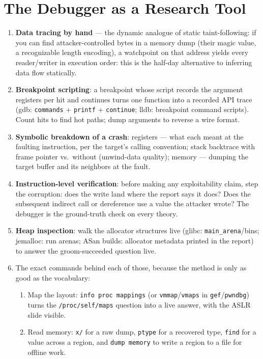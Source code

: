 \documentclass[12pt]{Training}
\begin{document}
\section*{The Debugger as a Research Tool}
\begin{enumerate}
    \item \textbf{Data tracing by hand} --- the dynamic analogue of static taint-following: if you can find attacker-controlled bytes in a memory dump (their magic value, a recognizable length encoding), a watchpoint on that address yields every reader/writer in execution order: this is the half-day alternative to inferring data flow statically.
    \item \textbf{Breakpoint scripting}: a breakpoint whose script records the argument registers per hit and continues turns one function into a recorded API trace (gdb: \lstinline{commands} + \lstinline{printf} + \lstinline{continue}; lldb: breakpoint command scripts). Count hits to find hot paths; dump arguments to reverse a wire format.
    \item \textbf{Symbolic breakdown of a crash}: registers --- what each meant at the faulting instruction, per the target's calling convention; stack backtrace with frame pointer vs.\ without (unwind-data quality); memory --- dumping the target buffer and its neighbors at the fault.
    \item \textbf{Instruction-level verification}: before making any exploitability claim, step the corruption: does the write land where the report says it does? Does the subsequent indirect call or dereference use a value the attacker wrote? The debugger is the ground-truth check on every theory.
    \item \textbf{Heap inspection}: walk the allocator structures live (glibc: \lstinline{main_arena}/bins; jemalloc: run arenas; ASan builds: allocator metadata printed in the report) to answer the groom-succeeded question live.
    \item The exact commands behind each of those, because the method is only as good as the vocabulary:
    \begin{enumerate}
        \item Map the layout: \lstinline{info proc mappings} (or \lstinline{vmmap}/\lstinline{vmaps} in \lstinline{gef}/\lstinline{pwndbg}) turns the \lstinline{/proc/self/maps} question into a live answer, with the ASLR slide visible.
        \item Read memory: \lstinline{x/} for a raw dump, \lstinline{ptype} for a recovered type, \lstinline{find} for a value across a region, and \lstinline{dump memory} to write a region to a file for offline work.

\end{enumerate}
\end{enumerate}
\end{document}
